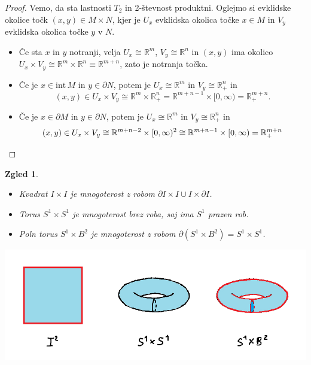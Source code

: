 \documentclass[10pt, a4paper]{article}
\newtheorem{zgled}[izr]{Zgled}
\newenvironment{noticeC}{%
  \tcolorbox[%
  notitle,
  empty,
  enhanced,  %
  breakable,
  coltext=black, 
  fontupper=\rmfamily,
  noparskip,
  sharp corners,
  boxrule=-1pt,  %
  frame hidden,
  left=7pt,  %
  right=7pt,
  top=5pt,
  bottom=5pt,
  before skip=2.5ex plus 2pt,
  after skip=2.5ex plus 2pt,
  overlay unbroken and last={%
  },
  ]}
{\endtcolorbox}
\newenvironment{dokaz}%
  {\begin{noticeC}\begin{proof}}%
  {\end{proof}\end{noticeC}}
\newcommand{\R}{\mathbb {R}}
\newcommand{\intem}{\mathrm{int}\,}
\begin{document}
\begin{dokaz}
  Vemo, da sta lastnosti $T_2$ in 2-števnost produktni.
  Oglejmo si evklidske okolice točk $(x, y) \in M \times N$, kjer je 
  $U_x$ evklidska okolica točke $x \in M$ in $V_y$ evklidska okolica točke 
  $y$ v $N$.
  \begin{itemize}
    \item Če sta $x$ in $y$ notranji, velja $U_x \cong \R^m$, $V_y \cong \R^n$ in 
    $(x, y)$ ima okolico $U_x \times V_y \cong \R^m \times \R^n \equiv \R^{m + n}$,
    zato je notranja točka.
    \item Če je $x \in \intem M$ in $y \in \partial N$, potem je $U_x \cong \R^m$ in $V_y \cong \R^n _+$
    in $$(x, y) \in U_x \times V_y \cong \R^m \times \R^n_+ = \R^{m + n-1} \times [0, \infty) = \R^{m + n}_+.$$
    \item Če je $x \in \partial M$ in $y \in \partial N$, potem je $U_x \cong \R^m$ in $V_y \cong \R^n _+$ in 
    \begin{equation*}
      (x, y) \in U_x \times V_y \cong \R^{m + n - 2} \times [0, \infty)^2 \cong \R^{m + n - 1} \times [0, \infty) = \R^{m + n}_+ \qedhere 
    \end{equation*}
  \end{itemize}
\end{dokaz}

\begin{zgled}
  \begin{itemize}
    \item Kvadrat $I \times I$ je mnogoterost z robom $\partial I \times I \cup I \times \partial I$.
    \item Torus $S^1 \times S^1$ je mnogoterost brez roba, saj ima $S^1$ prazen rob.
    \item Poln torus $S^1 \times B^2$ je mnogoterost z robom $\partial (S^1 \times B^2) = S^1 \times S^1$.
  \end{itemize}
  \begin{center}
    \includegraphics[scale=0.6]{torus.png}
  \end{center}
\end{zgled}
\end{document}
